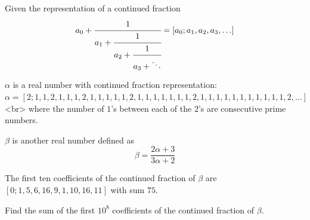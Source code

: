 Given the representation of a continued fraction
$$ a_0+ \cfrac 1{a_1+ \cfrac 1{a_2+\cfrac 1{a_3+\ddots }}}= [a_0;a_1,a_2,a_3,\ldots] $$

$\alpha$ is a real number with continued fraction representation:
$\alpha = [2;1,1,2,1,1,1,2,1,1,1,1,1,2,1,1,1,1,1,1,1,2,1,1,1,1,1,1,1,1,1,1,1,2,\ldots]$<br> where the number of $1$'s between each of the $2$'s are consecutive prime numbers.

$\beta$ is another real number defined as
$$	\beta = \frac{2\alpha+3}{3\alpha+2} $$

The first ten coefficients of the continued fraction of $\beta$ are $[0;1,5,6,16,9,1,10,16,11]$ with sum $75$.

Find the sum of the first $10^8$ coefficients of the continued fraction of $\beta$.
